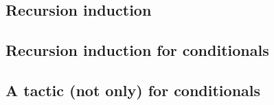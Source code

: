 \label{sec:rec-ind}

\subsection{Recursion induction}

\subsection{Recursion induction for conditionals}

\subsection{A tactic (not only) for conditionals}
